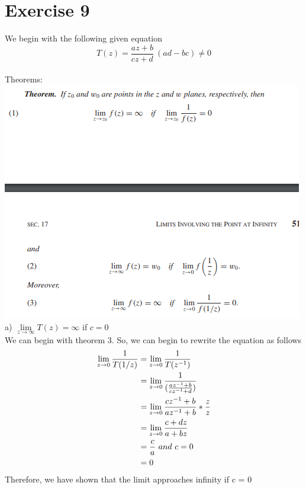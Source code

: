 \documentclass[notitlepage]{article}
\begin{document}
\section*{Exercise 9}

    \hspace{1cm} We begin with the following given equation
    $$T(z) = \frac{az+b}{cz+d} \ (ad-bc) \neq 0$$ \\
    Theorems:\\
\includegraphics[scale=0.4]{hw1_9} \\
    a)  $\lim\limits_{z \to \infty}T(z) = \infty$ if $c=0$\\
    We can begin with theorem 3. So, we can begin to rewrite the equation as follows
\begin{equation}
    \begin{split}
        \notag
        \lim\limits_{z \to 0} \frac{1}{T(1/z)} &=  \lim\limits_{z \to 0} \frac{1}{T(z^{-1})} \\
                &=  \lim\limits_{z \to 0} \frac{1}{(\frac{az^{-1}+b}{cz^{-1}+d})} \\
                &=  \lim\limits_{z \to 0} \frac{cz^{-1}+b}{az^{-1}+b} * \frac{z}{z} \\
                &=  \lim\limits_{z \to 0} \frac{c+dz}{a+bz} \\
                &= \frac{c}{a} \ and \ c=0\\
                &= 0 \\
    \end{split}
\end{equation}
    Therefore, we have shown that the limit approaches infinity if c = 0 \\~\\
\end{document}
